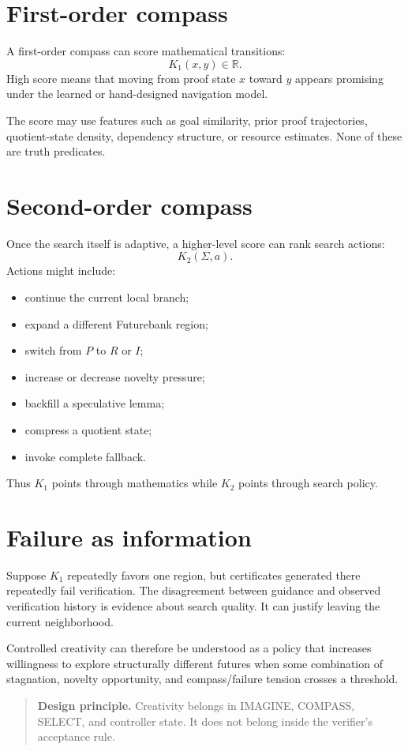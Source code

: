 \documentclass[11pt,openany]{book}
\theoremstyle{definition}
\theoremstyle{remark}
\newenvironment{designbox}{\begin{quote}\small\color{green!35!black}\textbf{Design principle.} }{\end{quote}}
\newcommand{\State}{\Sigma}
\begin{document}
\section{First-order compass}
A first-order compass can score mathematical transitions:
\[
K_1(x,y)\in\mathbb R.
\]
High score means that moving from proof state $x$ toward $y$ appears promising under the learned or hand-designed navigation model.

The score may use features such as goal similarity, prior proof trajectories, quotient-state density, dependency structure, or resource estimates. None of these are truth predicates.

\section{Second-order compass}
Once the search itself is adaptive, a higher-level score can rank search actions:
\[
K_2(\State,a).
\]
Actions might include:
\begin{itemize}
\item continue the current local branch;
\item expand a different Futurebank region;
\item switch from $P$ to $R$ or $I$;
\item increase or decrease novelty pressure;
\item backfill a speculative lemma;
\item compress a quotient state;
\item invoke complete fallback.
\end{itemize}
Thus $K_1$ points through mathematics while $K_2$ points through search policy.

\section{Failure as information}
Suppose $K_1$ repeatedly favors one region, but certificates generated there repeatedly fail verification. The disagreement between guidance and observed verification history is evidence about search quality. It can justify leaving the current neighborhood.

Controlled creativity can therefore be understood as a policy that increases willingness to explore structurally different futures when some combination of stagnation, novelty opportunity, and compass/failure tension crosses a threshold.

\begin{designbox}
Creativity belongs in IMAGINE, COMPASS, SELECT, and controller state. It does not belong inside the verifier's acceptance rule.
\end{designbox}
\end{document}
